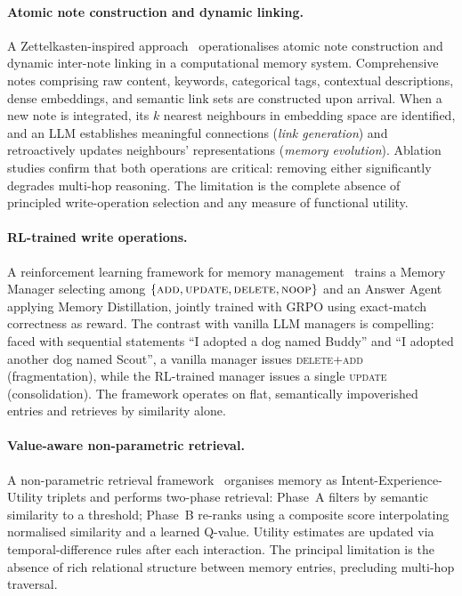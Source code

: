 \documentclass{article}
\begin{document}
\paragraph{Atomic note construction and dynamic linking.}
A Zettelkasten-inspired approach~\cite{amem2025} operationalises atomic note
construction and dynamic inter-note linking in a computational memory system.
Comprehensive notes comprising raw content, keywords, categorical tags,
contextual descriptions, dense embeddings, and semantic link sets are
constructed upon arrival.
When a new note is integrated, its $k$ nearest neighbours in embedding space
are identified, and an LLM establishes meaningful connections (\emph{link
generation}) and retroactively updates neighbours' representations
(\emph{memory evolution}).
Ablation studies confirm that both operations are critical: removing either
significantly degrades multi-hop reasoning.
The limitation is the complete absence of principled write-operation selection
and any measure of functional utility.

\paragraph{RL-trained write operations.}
A reinforcement learning framework for memory management~\cite{memoryr12025}
trains a Memory Manager selecting among
$\{\textsc{add}, \textsc{update}, \textsc{delete}, \textsc{noop}\}$ and an
Answer Agent applying Memory Distillation, jointly trained with GRPO using
exact-match correctness as reward.
The contrast with vanilla LLM managers is compelling: faced with sequential
statements ``I adopted a dog named Buddy'' and ``I adopted another dog named
Scout'', a vanilla manager issues \textsc{delete}+\textsc{add} (fragmentation),
while the RL-trained manager issues a single \textsc{update} (consolidation).
The framework operates on flat, semantically impoverished entries and retrieves
by similarity alone.

\paragraph{Value-aware non-parametric retrieval.}
A non-parametric retrieval framework~\cite{memrl2026} organises memory as
Intent-Experience-Utility triplets and performs two-phase retrieval: Phase~A
filters by semantic similarity to a threshold; Phase~B re-ranks using a
composite score interpolating normalised similarity and a learned Q-value.
Utility estimates are updated via temporal-difference rules after each
interaction.
The principal limitation is the absence of rich relational structure between
memory entries, precluding multi-hop traversal.
\end{document}
